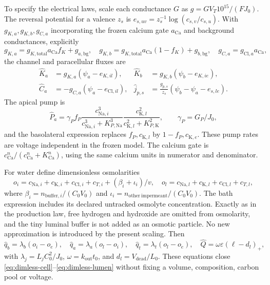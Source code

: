 To specify the electrical laws, scale each conductance $G$ as
$g=GV_T10^{15}/(FJ_0)$.  The reversal potential for a valence $z_s$ is
$e_{s,uv}=z_s^{-1}\log(c_{s,v}/c_{s,u})$.  With
$g_{K,a},g_{K,b},g_{C,a}$ incorporating the frozen calcium gate
$a_{\mathrm{Ca}}$ and background conductances, explicitly
\[
 g_{K,a}=g_{K,\mathrm{total}}a_{\mathrm{Ca}}f_K+g_{a,\mathrm{bg}},\quad
 g_{K,b}=g_{K,\mathrm{total}}a_{\mathrm{Ca}}(1-f_K)+g_{b,\mathrm{bg}},\quad
 g_{C,a}=g_{\mathrm{Cl},a}a_{\mathrm{Ca}},
\]
the channel and paracellular fluxes are
\begin{align*}
 \widehat K_a&=g_{K,a}(\psi_a-e_{K,il}), &
 \widehat K_b&=g_{K,b}(\psi_b-e_{K,ie}),\\
 \widehat C_a&=-g_{C,a}(\psi_a-e_{\mathrm{Cl},il}), &
 \widehat j_{p,s}&=\frac{g_{p,s}}{z_s}
   (\psi_b-\psi_a-e_{s,le}).
\end{align*}
The apical pump is
\[
 \widehat P_a=\gamma_P f_P
 \frac{c_{\mathrm{Na},i}^3}{c_{\mathrm{Na},i}^3+K_{P,\mathrm{Na}}^3}
 \frac{c_{\mathrm K,l}^2}{c_{\mathrm K,l}^2+K_{P,\mathrm K}^2},
 \qquad\gamma_P=G_P/J_0,
\]
and the basolateral expression replaces $f_P,c_{\mathrm K,l}$ by
$1-f_P,c_{\mathrm K,e}$.  These pump rates are voltage independent in the
frozen model.  The calcium gate is $c_{\mathrm{Ca}}^n/(c_{\mathrm{Ca}}^n+K_{\mathrm{Ca}}^n)$,
using the same calcium units in numerator and denominator.

For water define dimensionless osmolarities
\[
 o_i=c_{\mathrm{Na},i}+c_{\mathrm K,i}+c_{\mathrm{Cl},i}+c_{T,i}
       +(\beta_i+\iota_i)/v,\quad
 o_l=c_{\mathrm{Na},l}+c_{\mathrm K,l}+c_{\mathrm{Cl},l}+c_{T,l},
\]
where $\beta_i=n_{\mathrm{buffer},i}/(C_0V_0)$ and
$\iota_i=n_{\mathrm{other\ impermeant}}/(C_0V_0)$.  The bath expression
includes its declared untracked osmolyte concentration.  Exactly as in the
production law, free hydrogen and hydroxide are omitted from osmolarity,
and the tiny luminal buffer is not added as an osmotic particle.  No new
approximation is introduced by the present scaling.  Then
\[
 \widehat q_b=\lambda_b(o_i-o_e),\quad
 \widehat q_a=\lambda_a(o_l-o_i),\quad
 \widehat q_t=\lambda_t(o_l-o_e),\quad
 \widehat Q=\omega\varepsilon(\ell-d_l)_+,
\]
with $\lambda_j=L_jC_0^2/J_0$, $\omega=k_{\mathrm{out}}t_0$,
and $d_l=V_{\mathrm{dead}}/L_0$.  These equations close
\eqref{eq:dimless-cell}--\eqref{eq:dimless-lumen} without fixing a volume,
composition, carbon pool or voltage.

